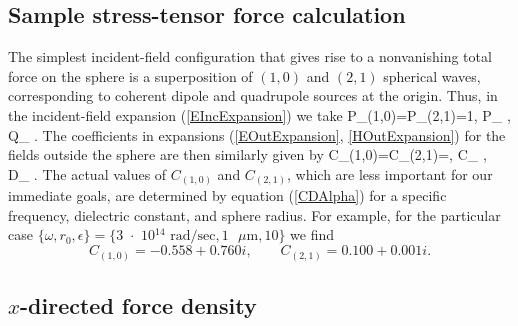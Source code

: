 \documentclass[letterpaper]{article}
\begin{document}
\subsection{Sample stress-tensor force calculation}

The simplest incident-field configuration that gives rise to a
nonvanishing total force on the sphere is a superposition of 
$(1,0)$ and $(2,1)$ spherical waves, corresponding to coherent
dipole and quadrupole sources at the origin. Thus, in the
incident-field expansion (\ref{EIncExpansion}) we take
{
 P_{(1,0)}=P_{(2,1)}=1,
 \qquad 
 P_ \alpha, 
 \qquad 
 Q_ \alpha.
}
The coefficients in expansions (\ref{EOutExpansion}, 
\ref{HOutExpansion}) for the fields outside the sphere 
are then similarly given by 
{
 C_{(1,0)}=C_{(2,1)}=,
 \qquad 
 C_ \alpha, 
 \qquad 
 D_ \alpha.
}
The actual values of $C_{(1,0)}$ and $C_{(2,1)}$, which
are less important for our immediate goals, are determined
by equation (\ref{CDAlpha}) for a specific frequency,
dielectric constant, and sphere radius. For example, 
for the particular case 
$\{ \omega, r_0, \epsilon\}
 =
 \{ \text{3 $\cdot$ 10$^{14}$ rad/sec},
    1\text{ $\mu$m},
    10
\}$
we find
$$ C_{(1,0)}=-0.558 + 0.760i, \qquad
   C_{(2,1)}= 0.100 + 0.001i.
$$

\subsection{$x$-directed force density}
\end{document}
